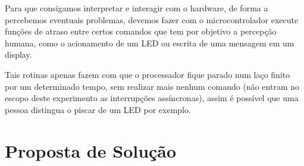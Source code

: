 \documentclass{article}
\begin{document}
Para que consigamos interpretar e interagir com o hardware, de forma a percebemos eventuais problemas, devemos fazer com o microcontrolador execute funções de atraso entre certos comandos que tem por objetivo a percepção humana, como o acionamento de um LED ou escrita de uma mensagem em um display.

Tais rotinas apenas fazem com que o processador fique parado num laço finito por um determinado tempo, sem realizar mais nenhum comando (não entram no escopo deste experimento as interrupções assíncronas), assim é possível que uma pessoa distingua o piscar de um LED por exemplo.


\section{Proposta de Solução}
\end{document}
